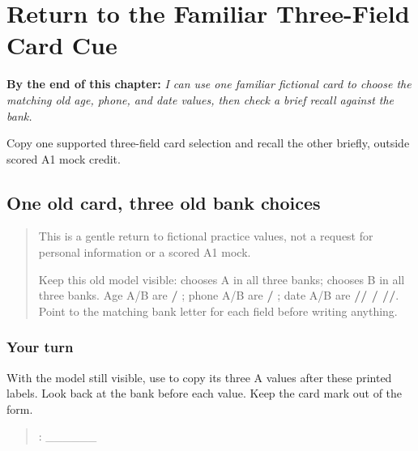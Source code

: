 
\chapter{Return to the Familiar Three-Field Card Cue}
\label{ch:pa-form-card-cue-r4}

\begin{chapteropening}
\textbf{By the end of this chapter:} \emph{I can use one familiar fictional card to choose the matching old age, phone, and date values, then check a brief recall against the bank.}

Copy one supported three-field card selection and recall the other briefly, outside scored A1 mock credit.
\end{chapteropening}

\section[\texorpdfstring{\pa{ਕ} / \pa{ਖ} (two familiar …)}{ਕ / ਖ (two familiar …)}]{One old card, three old bank choices}

\label{lesson:PA-R174-form-card-cue-again}



\begin{quote}
This is a gentle return to fictional practice values, not a request for personal information or a scored A1 mock.

Keep this old model visible: \textbf{} chooses A in all three banks; \textbf{} chooses B in all three banks. Age A/B are \textbf{ / }; phone A/B are \textbf{  /  }; date A/B are \textbf{// / //}. Point to the matching bank letter for each field before writing anything.
\end{quote}

\subsection*{Your turn}
With the model still visible, use \textbf{} to copy its three A values after these printed labels. Look back at the bank before each value. Keep the card mark out of the form.

\begin{quote}
: \_\_\_\_\_\_
\end{quote}

